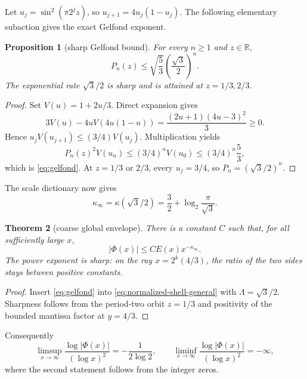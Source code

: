\documentclass[11pt,oneside]{article}
\newtheorem{theorem}{Theorem}[section]
\newtheorem{proposition}[theorem]{Proposition}
\theoremstyle{definition}
\theoremstyle{remark}
\newcommand{\R}{\mathbb R}
\begin{document}
Let \(u_j=\sin^2(\pi2^jz)\), so
\(u_{j+1}=4u_j(1-u_j)\).  The following elementary subaction gives the exact
Gelfond exponent.

\begin{proposition}[sharp Gelfond bound]
\label{prop:gelfond}
For every \(n\ge1\) and \(z\in\R\),
\begin{equation}
 P_n(z)\le\sqrt{\frac53}\left(\frac{\sqrt3}{2}\right)^n.
 \label{eq:gelfond}
\end{equation}
The exponential rate \(\sqrt3/2\) is sharp and is attained at
\(z=1/3,2/3\).
\end{proposition}

\begin{proof}
Set \(V(u)=1+2u/3\).  Direct expansion gives
\begin{equation}
 3V(u)-4uV(4u(1-u))
 =\frac{(2u+1)(4u-3)^2}{3}\ge0.
 \label{eq:subaction-identity}
\end{equation}
Hence
\(u_jV(u_{j+1})\le(3/4)V(u_j)\).  Multiplication yields
\[
 P_n(z)^2V(u_n)\le(3/4)^nV(u_0)
 \le(3/4)^n\frac53,
\]
which is \eqref{eq:gelfond}.  At \(z=1/3\) or \(2/3\), every
\(u_j=3/4\), so \(P_n=(\sqrt3/2)^n\).
\end{proof}

The scale dictionary now gives
\begin{equation}
 \kappa_\infty
 =\kappa(\sqrt3/2)
 =\frac32+\log_2\frac\pi{\sqrt3}.
 \label{eq:kappainfty}
\end{equation}

\begin{theorem}[coarse global envelope]
\label{thm:coarse-envelope}
There is a constant \(C\) such that, for all sufficiently large \(x\),
\begin{equation}
 |\Phi(x)|\le C E(x)x^{-\kappa_\infty}.
 \label{eq:coarse-envelope}
\end{equation}
The power exponent is sharp: on the ray \(x=2^k(4/3)\), the ratio of the two
sides stays between positive constants.
\end{theorem}

\begin{proof}
Insert \eqref{eq:gelfond} into
\eqref{eq:normalized-shell-general} with
\(\Lambda=\sqrt3/2\).  Sharpness follows from the period-two orbit
\(z=1/3\) and positivity of the bounded mantissa factor at \(y=4/3\).
\end{proof}

Consequently
\begin{equation}
 \limsup_{x\to\infty}\frac{\log|\Phi(x)|}{(\log x)^2}
 =-\frac1{2\log2},
 \qquad
 \liminf_{x\to\infty}\frac{\log|\Phi(x)|}{(\log x)^2}=-\infty,
 \label{eq:universal-lims}
\end{equation}
where the second statement follows from the integer zeros.
\end{document}
